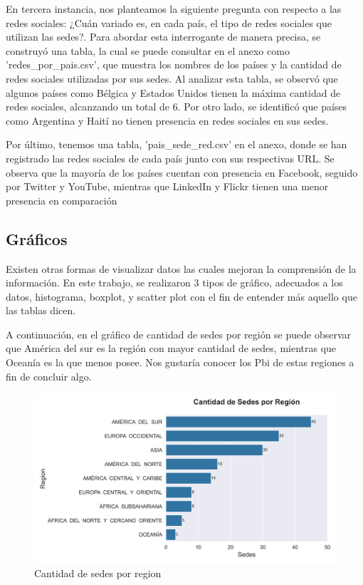 \documentclass[10pt,a4paper]{article}
\begin{document}
\vspace{12pt}

En tercera instancia, nos planteamos la siguiente pregunta con respecto a las redes sociales: ¿Cuán variado es, en cada país, el tipo de redes sociales que utilizan las sedes?. Para abordar esta interrogante de manera precisa, se construyó una tabla, la cual se puede consultar en el anexo como 'redes\_por\_pais.csv', que muestra los nombres de los países y la cantidad de redes sociales utilizadas por sus sedes. Al analizar esta tabla, se observó que algunos países como Bélgica y Estados Unidos tienen la máxima cantidad de redes sociales, alcanzando un total de 6. Por otro lado, se identificó que países como Argentina y Haití no tienen presencia en redes sociales en sus sedes.

\vspace{0.1cm}

Por último, tenemos una tabla, 'pais\_sede\_red.csv' en el anexo, donde se han registrado las redes sociales de cada país junto con sus respectivas URL. Se observa que la mayoría de los países cuentan con presencia en Facebook, seguido por Twitter y YouTube, mientras que LinkedIn y Flickr tienen una menor presencia en comparación


\subsection{Gráficos} \vspace{0.3cm}

Existen otras formas de visualizar datos las cuales mejoran la comprensión de la información. En este trabajo, se realizaron 3 tipos de gráfico, adecuados a los datos, histograma, boxplot, y scatter plot con el fin de entender más aquello que las tablas dicen. \par
A continuación, en el gráfico de cantidad de sedes por región se puede observar que América del sur es la región con mayor cantidad de sedes, mientras que Oceanía es la que menos posee. Nos gustaría conocer los Pbi de estas regiones a fin de concluir algo.

\vspace{12pt}

\begin{figure}[h]
  \centering
  \includegraphics[width=1\textwidth]{bar_region.png}
  \caption{ Cantidad de sedes por region}
  \label{fig:Tabla 2}
\end{figure}
\end{document}
